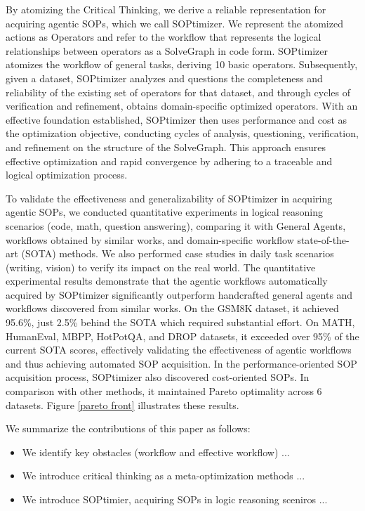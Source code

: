 By atomizing the Critical Thinking, we derive a reliable representation for acquiring agentic SOPs, which we call SOPtimizer. We represent the atomized actions as Operators and refer to the workflow that represents the logical relationships between operators as a SolveGraph in code form. SOPtimizer atomizes the workflow of general tasks, deriving 10 basic operators. Subsequently, given a dataset, SOPtimizer analyzes and questions the completeness and reliability of the existing set of operators for that dataset, and through cycles of verification and refinement, obtains domain-specific optimized operators. With an effective foundation established, SOPtimizer then uses performance and cost as the optimization objective, conducting cycles of analysis, questioning, verification, and refinement on the structure of the SolveGraph. This approach ensures effective optimization and rapid convergence by adhering to a traceable and logical optimization process.

To validate the effectiveness and generalizability of SOPtimizer in acquiring agentic SOPs, we conducted quantitative experiments in logical reasoning scenarios (code, math, question answering), comparing it with General Agents, workflows obtained by similar works, and domain-specific workflow state-of-the-art (SOTA) methods. We also performed case studies in daily task scenarios (writing, vision) to verify its impact on the real world. The quantitative experimental results demonstrate that the agentic workflows automatically acquired by SOPtimizer significantly outperform handcrafted general agents and workflows discovered from similar works. On the GSM8K dataset, it achieved 95.6\%, just 2.5\% behind the SOTA which required substantial effort. On MATH, HumanEval, MBPP, HotPotQA, and DROP datasets, it exceeded over 95\% of the current SOTA scores, effectively validating the effectiveness of agentic workflows and thus achieving automated SOP acquisition. In the performance-oriented SOP acquisition process, SOPtimizer also discovered cost-oriented SOPs. In comparison with other methods, it maintained Pareto optimality across 6 datasets. Figure \ref{pareto front} illustrates these results.

We summarize the contributions of this paper as follows:

\begin{itemize}
    \item We identify key obstacles (workflow and effective workflow) ...
    \item We introduce critical thinking as a meta-optimization methods ...
    \item We introduce SOPtimier, acquiring SOPs in logic reasoning sceniros ... 
\end{itemize} 